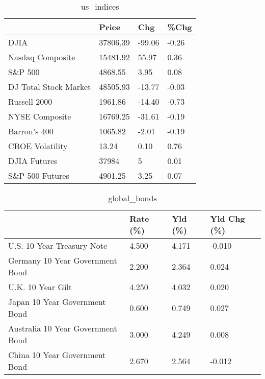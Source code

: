 \documentclass{article}%
\begin{document}
%


\begin{table}[htbp]%
\caption{us\_indices}%
\centering%
\begin{adjustbox}{width=1\textwidth}%
\begin{tabular}{llll}
\toprule
                      &    Price &    Chg &  \%Chg \\
\midrule
                 DJIA & 37806.39 & -99.06 & -0.26 \\
     Nasdaq Composite & 15481.92 &  55.97 &  0.36 \\
              S\&P 500 &  4868.55 &   3.95 &  0.08 \\
DJ Total Stock Market & 48505.93 & -13.77 & -0.03 \\
         Russell 2000 &  1961.86 & -14.40 & -0.73 \\
       NYSE Composite & 16769.25 & -31.61 & -0.19 \\
         Barron's 400 &  1065.82 &  -2.01 & -0.19 \\
      CBOE Volatility &    13.24 &   0.10 &  0.76 \\
         DJIA Futures &    37984 &      5 &  0.01 \\
      S\&P 500 Futures &  4901.25 &   3.25 &  0.07 \\
\bottomrule
\end{tabular}
%
\end{adjustbox}%
\end{table}

%


\begin{table}[htbp]%
\caption{global\_bonds}%
\centering%
\begin{adjustbox}{width=1\textwidth}%
\begin{tabular}{llll}
\toprule
                                  & Rate (\%) & Yld (\%) & Yld Chg (\%) \\
\midrule
       U.S. 10 Year Treasury Note &    4.500 &   4.171 &      -0.010 \\
  Germany 10 Year Government Bond &    2.200 &   2.364 &       0.024 \\
                U.K. 10 Year Gilt &    4.250 &   4.032 &       0.020 \\
    Japan 10 Year Government Bond &    0.600 &   0.749 &       0.027 \\
Australia 10 Year Government Bond &    3.000 &   4.249 &       0.008 \\
    China 10 Year Government Bond &    2.670 &   2.564 &      -0.012 \\
\bottomrule
\end{tabular}
%
\end{adjustbox}%
\end{table}
\end{document}
